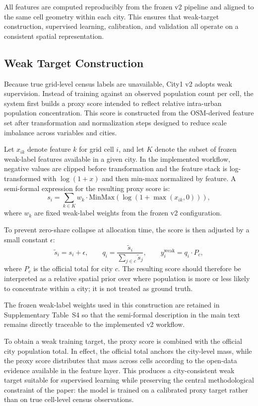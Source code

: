 All features are computed reproducibly from the frozen v2 pipeline and aligned to the same cell geometry within each city. This ensures that weak-target construction, supervised learning, calibration, and validation all operate on a consistent spatial representation.

\subsection{Weak Target Construction}

Because true grid-level census labels are unavailable, City1 v2 adopts weak supervision. Instead of training against an observed population count per cell, the system first builds a proxy score intended to reflect relative intra-urban population concentration. This score is constructed from the OSM-derived feature set after transformation and normalization steps designed to reduce scale imbalance across variables and cities.

Let $x_{ik}$ denote feature $k$ for grid cell $i$, and let $K$ denote the subset of frozen weak-label features available in a given city. In the implemented workflow, negative values are clipped before transformation and the feature stack is log-transformed with $\log(1 + x)$ and then min-max normalized by feature. A semi-formal expression for the resulting proxy score is:
\[
s_i = \sum_{k \in K} w_k \cdot \mathrm{MinMax}\!\left(\log\!\left(1 + \max(x_{ik}, 0)\right)\right),
\]
where $w_k$ are fixed weak-label weights from the frozen v2 configuration.

To prevent zero-share collapse at allocation time, the score is then adjusted by a small constant $\epsilon$:
\[
\tilde{s}_i = s_i + \epsilon,
\qquad
q_i = \frac{\tilde{s}_i}{\sum_{j \in c} \tilde{s}_j},
\qquad
y_i^{\mathrm{weak}} = q_i \cdot P_c,
\]
where $P_c$ is the official total for city $c$. The resulting score should therefore be interpreted as a relative spatial prior over where population is more or less likely to concentrate within a city; it is not treated as ground truth.

The frozen weak-label weights used in this construction are retained in Supplementary Table~S4 so that the semi-formal description in the main text remains directly traceable to the implemented v2 workflow.

To obtain a weak training target, the proxy score is combined with the official city population total. In effect, the official total anchors the city-level mass, while the proxy score distributes that mass across cells according to the open-data evidence available in the feature layer. This produces a city-consistent weak target suitable for supervised learning while preserving the central methodological constraint of the paper: the model is trained on a calibrated proxy target rather than on true cell-level census observations.

